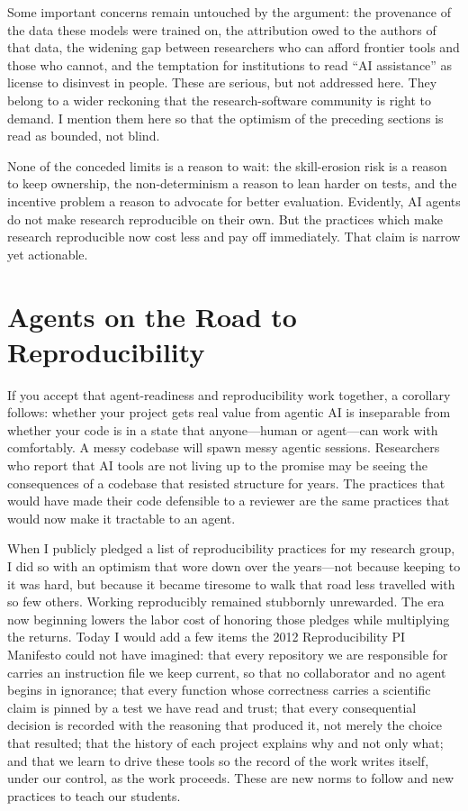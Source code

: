 \documentclass{IEEEcsmag}
\begin{document}
Some important concerns remain untouched by the argument: the provenance of the data these models were trained on, the attribution owed to the authors of that data, the widening gap between researchers who can afford frontier tools and those who cannot, and the temptation for institutions to read ``AI assistance'' as license to disinvest in people. These are serious, but not addressed here. They belong to a wider reckoning that the research-software community is right to demand. I mention them here so that the optimism of the preceding sections is read as bounded, not blind.

None of the conceded limits is a reason to wait: the skill-erosion risk is a reason to keep ownership, the non-determinism a reason to lean harder on tests, and the incentive problem a reason to advocate for better evaluation. Evidently, AI agents do not make research reproducible on their own. But the practices which make research reproducible now cost less and pay off immediately. That claim is narrow yet actionable.

\section{Agents on the Road to Reproducibility}

If you accept that agent-readiness and reproducibility work together, a corollary follows: whether your project gets real value from agentic AI is inseparable from whether your code is in a state that anyone---human or agent---can work with comfortably. A messy codebase will spawn messy agentic sessions. Researchers who report that AI tools are not living up to the promise may be seeing the consequences of a codebase that resisted structure for years. The practices that would have made their code defensible to a reviewer are the same practices that would now make it tractable to an agent.

When I publicly pledged a list of reproducibility practices for my research group, I did so with an optimism that wore down over the years---not because keeping to it was hard, but because it became tiresome to walk that road less travelled with so few others. Working reproducibly remained stubbornly unrewarded. The era now beginning lowers the labor cost of honoring those pledges while multiplying the returns. Today I would add a few items the 2012 Reproducibility PI Manifesto could not have imagined: that every repository we are responsible for carries an instruction file we keep current, so that no collaborator and no agent begins in ignorance; that every function whose correctness carries a scientific claim is pinned by a test we have read and trust; that every consequential decision is recorded with the reasoning that produced it, not merely the choice that resulted; that the history of each project explains why and not only what; and that we learn to drive these tools so the record of the work writes itself, under our control, as the work proceeds. These are new norms to follow and new practices to teach our students.
\end{document}

